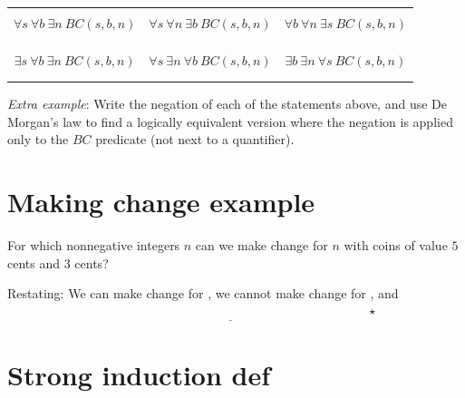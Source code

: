\documentclass[12pt, oneside]{article}
\begin{document}
\vspace{-20pt}

\begin{center}
\begin{tabular}{|c|c|c|}
\hline
&&\\
$\forall s ~\forall b ~\exists n~BC(s,b,n)$ & $\forall s ~\forall n ~ \exists b~BC(s,b,n)$ & $\forall b ~\forall n ~\exists s~BC(s,b,n)$ \\
&&\\
&&\\
\hline
&&\\
$\exists s ~\forall b ~\exists n~BC(s,b,n)$ & $\forall s~ \exists n ~\forall b~BC(s,b,n)$ & $\exists b ~\exists n ~\forall s~BC(s,b,n)$ \\
&&\\
&&\\
\hline
\end{tabular}
\end{center}

{\it Extra example}: Write the negation of each of the statements above, and use De Morgan's law to find a 
logically equivalent version where the negation is applied only to the $BC$ predicate (not next to a quantifier).

 \vfill
\section*{Making change example}


For which nonnegative integers  $n$ can we make change for $n$ with coins of 
value $5$ cents and $3$ cents?


Restating: We can make change for \underline{\phantom{$3$~~,~~ $5$~~,~~ $6$}}, we
cannot make change for \underline{\phantom{$1$~~,~~ $2$~~,~~ $4$~~,~~ $7$}}, and 
\[
\underline{\phantom{\forall n  \in  \mathbb{Z}^{\geq 8}  \exists x \in \mathbb{N}  \exists y \in \mathbb{N}  (  5x+3y =  n)\qquad \qquad}} \star
\]

\vfill \vfill
\section*{Strong induction def}


\end{document}
